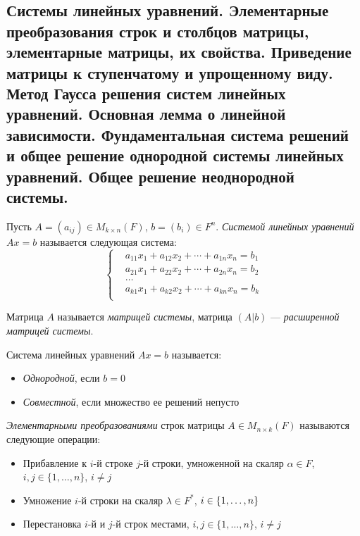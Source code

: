\subsection{Системы линейных уравнений. Элементарные преобразования строк и столбцов матрицы, элементарные матрицы, их свойства. Приведение матрицы к ступенчатому и упрощенному виду. Метод Гаусса решения систем линейных уравнений. Основная лемма о линейной зависимости. Фундаментальная система решений и общее решение однородной системы линейных уравнений. Общее решение неоднородной системы.}

    \begin{definition}
    	Пусть $A = (a_{ij}) \in M_{k \times n}(F)$, $b = (b_i) \in F^n$. \textit{Системой линейных уравнений} $Ax = b$ называется следующая система:
    	\[
    	\left\{
    	\begin{aligned}
    	&a_{11}x_1 + a_{12}x_2 + \dotsb + a_{1n}x_n = b_1\\
    	&a_{21}x_1 + a_{22}x_2 + \dotsb + a_{2n}x_n = b_2\\
    	&\dots\\
    	&a_{k1}x_1 + a_{k2}x_2 + \dotsb + a_{kn}x_n = b_k\\
    	\end{aligned}
    	\right.
    	\]
    	
    	Матрица $A$ называется \textit{матрицей системы}, матрица $(A|b)$ --- \textit{ расширенной матрицей системы}.
    \end{definition}
    
    \begin{definition}
    	Система линейных уравнений $Ax = b$ называется:
    	\begin{itemize}
    		\item \textit{Однородной}, если $b = 0$
    		\item \textit{Совместной}, если множество ее решений непусто
    	\end{itemize} 
    \end{definition}
    
    \begin{definition}
    	\textit{Элементарными преобразованиями} строк матрицы $A \in M_{n \times k}(F)$ называются следующие операции:
    	\begin{itemize}
    		\item Прибавление к $i$-й строке $j$-й строки, умноженной на скаляр $\alpha \in F$, $i, j \in \{1, \dotsc, n\}$, $i \ne j$
    		\item Умножение $i$-й строки на скаляр $\lambda \in F^*$, $i \in \{1, \dotsc, n\}$
    		\item Перестановка $i$-й и $j$-й строк местами, $i, j \in \{1, \dotsc, n\}$, $i \ne j$
    	\end{itemize}
    \end{definition}
    
